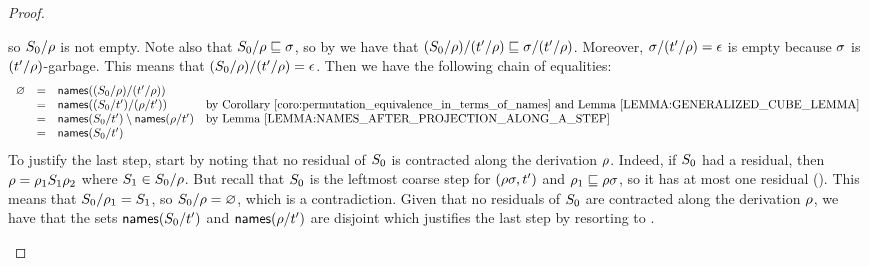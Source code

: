 \begin{proof}
\begin{enumerate}
\begin{enumerate}
    so $S_0/\rho$ is not empty.
    Note also that $S_0/\rho \sqsubseteq \sigma$,
    so by 
    we have that $(S_0/\rho)/(t'/\rho) \sqsubseteq \sigma/(t'/\rho)$.
    Moreover, $\sigma/(t'/\rho) = \epsilon$ is empty because $\sigma$ is $(t'/\rho)$-garbage.
    This means that $(S_0/\rho)/(t'/\rho) = \epsilon$.
    Then we have the following chain of equalities:
    \[
      \begin{array}{rcll}
        \emptyset & = & \names((\redextwo_0/\redseq)/(\tm'/\redseq)) \\
                  & = & \names((\redextwo_0/\tm')/(\redseq/\tm'))               & \text{by \rcoro{permutation_equivalence_in_terms_of_names} and \rlem{generalized_cube_lemma}} \\
                  & = & \names(\redextwo_0/\tm') \setminus \names(\redseq/\tm') & \text{by \rlem{names_after_projection_along_a_step}} \\
                  & = & \names(\redextwo_0/\tm')
      \end{array}
    \]
    To justify the last step, start by noting that no residual of $S_0$ is contracted along the derivation $\rho$.
    Indeed, if $S_0$ had a residual, then $\rho = \rho_1S_1\rho_2$ where $S_1 \in S_0/\rho$.
    But recall that $S_0$ is the leftmost coarse step for $(\rho\sigma,t')$ and
    $\rho_1 \sqsubseteq \rho\sigma$, so it has at most one residual ().
    This means that $S_0/\rho_1 = S_1$, so $S_0/\rho = \varnothing$, which is a contradiction.
    Given that no residuals of $S_0$ are contracted along the derivation $\rho$,
    we have that the sets $\mathsf{names}(S_0/t')$ and $\mathsf{names}(\rho/t')$ are disjoint
    which justifies the last step by resorting to .
    

\end{enumerate}
\end{enumerate}
\end{proof}
